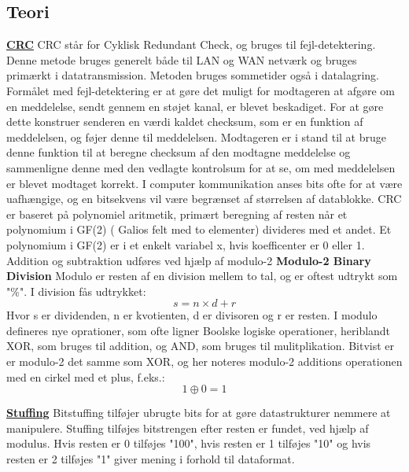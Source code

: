 \subsection{Teori}
\underline{\textbf{CRC}}
\newline
CRC står for Cyklisk Redundant Check, og bruges til fejl-detektering. Denne metode bruges generelt både til LAN og WAN netværk og bruges primærkt i datatransmission. Metoden bruges sommetider også i datalagring.
Formålet med fejl-detektering er at gøre det muligt for modtageren at afgøre om en meddelelse, sendt gennem en støjet kanal, er blevet beskadiget.
For at gøre dette konstruer senderen en værdi kaldet checksum, som er en funktion af meddelelsen, og føjer denne til meddelelsen.
Modtageren er i stand til at bruge denne funktion til at beregne checksum af den modtagne meddelelse og sammenligne denne med den vedlagte kontrolsum for at se, om med meddelelsen er blevet modtaget korrekt.\cite{ross}
\newline
I computer kommunikation anses bits ofte for at være uafhængige, og en bitsekvens vil være begrænset af størrelsen af datablokke.\cite{dllein}
\newline
CRC er baseret på polynomiel aritmetik, primært beregning af resten når et polynomium i GF(2) ( Galios felt med to elementer) divideres med et andet. Et polynomium i GF(2) er i et enkelt variabel x, hvis koefficenter er 0 eller 1. Addition og subtraktion udføres ved hjælp af modulo-2
\newline
\textbf{Modulo-2 Binary Division}
\newline
Modulo er resten af en division mellem to tal, og er oftest udtrykt som "\%".
\newline
I division fås udtrykket:
$$s = n \times d + r$$
\newline
Hvor s er dividenden, n er kvotienten, d er divisoren og r er resten.
\newline
I modulo defineres nye oprationer, som ofte ligner Boolske logiske operationer, heriblandt XOR, som bruges til addition, og AND, som bruges til mulitplikation.
Bitvist er er modulo-2 det samme som XOR, og her noteres modulo-2 additions operationen med en cirkel med et plus, f.eks.: 
$$1 \oplus 0 = 1$$

\hfill \break
\underline{\textbf{Stuffing}}
\newline
Bitstuffing tilføjer ubrugte bits for at gøre datastrukturer nemmere at manipulere.
\newline
Stuffing tilføjes bitstrengen efter resten er fundet, ved hjælp af modulus. Hvis resten er 0 tilføjes "100", hvis resten er 1 tilføjes "10" og hvis resten er 2 tilføjes "1"
giver mening i forhold til dataformat.